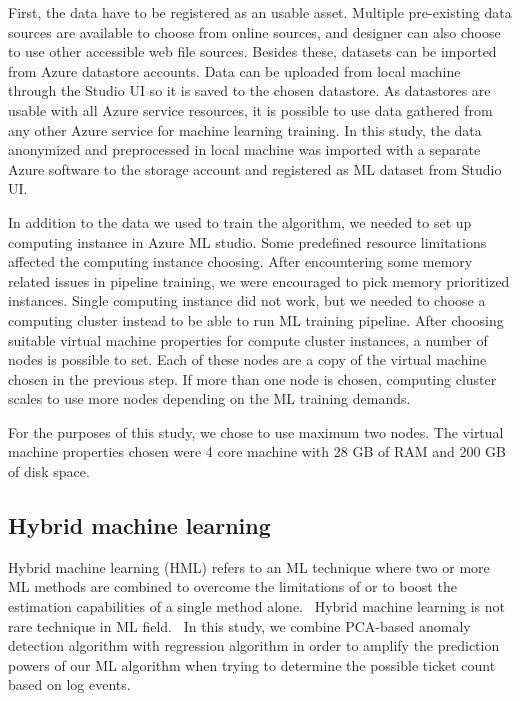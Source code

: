 First,
the data have to be registered as an usable asset.
Multiple pre-existing data sources are available to choose
from online sources,
and designer can also choose to use
other accessible web file sources.
Besides these,
datasets can be imported from Azure datastore accounts.
Data can be uploaded from local machine through the Studio UI
so it is saved to the chosen datastore.
As datastores are usable with all Azure service resources,
it is possible to use data gathered from any other Azure service
for machine learning training.
In this study,
the data anonymized and preprocessed in local machine
was imported with a separate Azure software to the storage account
and registered as ML dataset from Studio UI.

In addition to the data we used to train the algorithm,
we needed to set up computing instance
in Azure ML studio.
Some predefined resource limitations
affected the computing instance choosing.
After encountering some memory related issues in pipeline training,
we were encouraged to pick memory prioritized instances.
Single computing instance did not work,
but we needed to choose a computing cluster instead
to be able to run ML training pipeline.
After choosing suitable virtual machine properties for compute cluster instances,
a number of nodes is possible to set.
Each of these nodes are a copy of the virtual machine
chosen in the previous step.
If more than one node is chosen,
computing cluster scales to use more nodes
depending on the ML training demands.

For the purposes of this study,
we chose to use maximum two nodes.
The virtual machine properties chosen
were 4 core machine with 28 GB of RAM and 200 GB of disk space.



\subsection{Hybrid machine learning}\label{subsec:bg-hybrid-ml}

Hybrid machine learning (HML)
refers to an ML technique
where two or more ML methods are combined
to overcome the limitations of
or to boost the estimation capabilities of
a single method alone.~\cite{Anifowose2020hml}
Hybrid machine learning is not rare technique in ML field.~\cite{shon2007hybrid,tsai2010credit,mohan2019effective,
    hsieh2005hybrid,jain2007hybrid,kim2007hybrid,lee2002credit,malhotra2002differentiating}
In this study,
we combine PCA-based anomaly detection algorithm
with regression algorithm
in order to amplify the prediction powers of our ML algorithm
when trying to determine the possible ticket count
based on log events.


